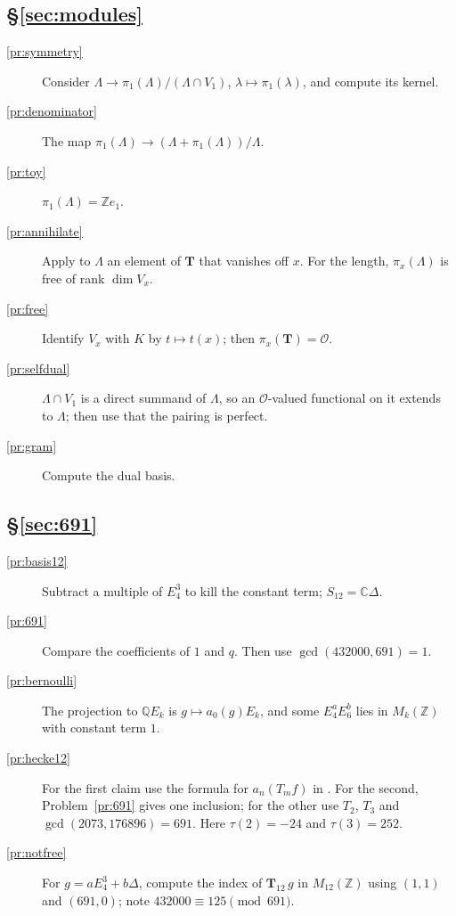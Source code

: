 \documentclass[reqno]{amsart}
\theoremstyle{definition}
\theoremstyle{plain}
\newcommand{\Z}{\mathbb{Z}}
\newcommand{\Q}{\mathbb{Q}}
\newcommand{\C}{\mathbb{C}}
\newcommand{\Oc}{\mathcal{O}}
\newcommand{\T}{\mathbf{T}}
\begin{document}
\subsection*{\S\ref{sec:modules}}
\begin{description}
\item[\ref{pr:symmetry}] Consider \(\Lambda \to \pi_1(\Lambda)/(\Lambda \cap V_1)\), \(\lambda \mapsto \pi_1(\lambda)\), and compute its kernel.
\item[\ref{pr:denominator}] The map \(\pi_1(\Lambda) \to (\Lambda + \pi_1(\Lambda))/\Lambda\).
\item[\ref{pr:toy}] \(\pi_1(\Lambda) = \Z e_1\).
\item[\ref{pr:annihilate}] Apply to \(\Lambda\) an element of \(\T\) that vanishes off \(x\).  For the length, \(\pi_x(\Lambda)\) is free of rank \(\dim V_x\).
\item[\ref{pr:free}] Identify \(V_x\) with \(K\) by \(t \mapsto t(x)\); then \(\pi_x(\T) = \Oc\).
\item[\ref{pr:selfdual}] \(\Lambda \cap V_1\) is a direct summand of \(\Lambda\), so an \(\Oc\)-valued functional on it extends to \(\Lambda\); then use that the pairing is perfect.
\item[\ref{pr:gram}] Compute the dual basis.
\end{description}

\subsection*{\S\ref{sec:691}}
\begin{description}
\item[\ref{pr:basis12}] Subtract a multiple of \(E_4^3\) to kill the constant term; \(S_{12} = \C\Delta\).
\item[\ref{pr:691}] Compare the coefficients of \(1\) and \(q\).  Then use \(\gcd(432000, 691) = 1\).
\item[\ref{pr:bernoulli}] The projection to \(\Q E_k\) is \(g \mapsto a_0(g)E_k\), and some \(E_4^aE_6^b\) lies in \(M_k(\Z)\) with constant term \(1\).
\item[\ref{pr:hecke12}] For the first claim use the formula for \(a_n(T_m f)\) in \cite[Ch.~VII, \S5.3]{SeA}.  For the second, Problem~\ref{pr:691} gives one inclusion; for the other use \(T_2\), \(T_3\) and \(\gcd(2073, 176896) = 691\).  Here \(\tau(2)=-24\) and \(\tau(3)=252\).
\item[\ref{pr:notfree}] For \(g = aE_4^3 + b\Delta\), compute the index of \(\T_{12}\,g\) in \(M_{12}(\Z)\) using \((1,1)\) and \((691,0)\); note \(432000 \equiv 125 \pmod{691}\).
\end{description}
\end{document}
